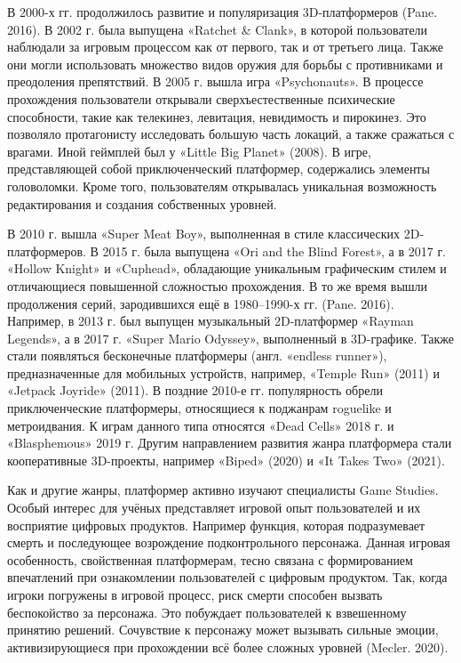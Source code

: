 В 2000-х гг. продолжилось развитие и популяризация 3D-платформеров (Pane. 2016). В 2002 г. была выпущена «Ratchet \& Clank», в которой пользователи наблюдали за игровым процессом как от первого, так и от третьего лица. Также они могли использовать множество видов оружия для борьбы с противниками и преодоления препятствий. В 2005 г. вышла игра «Psychonauts». В процессе прохождения пользователи открывали сверхъестественные психические способности, такие как телекинез, левитация, невидимость и пирокинез. Это позволяло протагонисту исследовать большую часть локаций, а также сражаться с врагами. Иной геймплей был у «Little Big Planet» (2008). В игре, представляющей собой приключенческий платформер, содержались элементы головоломки. Кроме того, пользователям открывалась уникальная возможность редактирования и создания собственных уровней.

В 2010 г. вышла «Super Meat Boy», выполненная в стиле классических 2D-платформеров. В 2015 г. была выпущена «Ori and the Blind Forest», а в 2017 г. «Hollow Knight» и «Cuphead», обладающие уникальным графическим стилем и отличающиеся повышенной сложностью прохождения. В то же время вышли продолжения серий, зародившихся ещё в 1980–1990-х гг. (Pane. 2016). Например, в 2013 г. был выпущен музыкальный 2D-платформер «Rayman Legends», а в 2017 г. «Super Mario Odyssey», выполненный в 3D-графике. Также стали появляться бесконечные платформеры (англ. «endless runner»), предназначенные для мобильных устройств, например, «Temple Run» (2011) и «Jetpack Joyride» (2011). В поздние 2010-е гг. популярность обрели приключенческие платформеры, относящиеся к поджанрам roguelike и метроидвания. К играм данного типа относятся «Dead Cells» 2018 г. и «Blasphemous» 2019 г. Другим направлением развития жанра платформера стали кооперативные 3D-проекты, например «Biped» (2020) и «It Takes Two» (2021).

Как и другие жанры, платформер активно изучают специалисты Game Studies. Особый интерес для учёных представляет игровой опыт пользователей и их восприятие цифровых продуктов. Например функция, которая подразумевает смерть и последующее возрождение подконтрольного персонажа. Данная игровая особенность, свойственная платформерам, тесно связана с формированием впечатлений при ознакомлении пользователей с цифровым продуктом. Так, когда игроки погружены в игровой процесс, риск смерти способен вызвать беспокойство за персонажа. Это побуждает пользователей к взвешенному принятию решений. Сочувствие к персонажу может вызывать сильные эмоции, активизирующиеся при прохождении всё более сложных уровней (Mecler. 2020).

